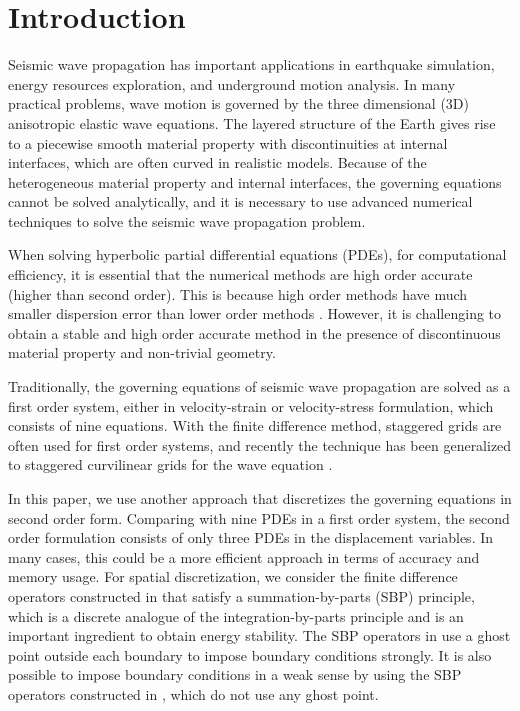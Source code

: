 \section{Introduction}
Seismic wave propagation has important applications in earthquake simulation, energy resources exploration, and underground motion analysis. In many practical problems, wave motion is governed by the three dimensional (3D) anisotropic elastic wave equations. The layered structure of the Earth gives rise to a piecewise smooth material property with discontinuities at internal interfaces, which are often curved in realistic models. Because of the heterogeneous material property and internal interfaces, the governing equations cannot be solved analytically, and it is necessary to use advanced numerical techniques to solve the seismic wave propagation problem.

When solving hyperbolic partial differential equations (PDEs), for computational efficiency, it is essential that the numerical methods are high order accurate (higher than second order). This is because high order methods have much smaller dispersion error than lower order methods  \cite{Hagstrom2012,Kreiss1972}. However, it is challenging to obtain a stable and high order accurate method in the presence of discontinuous material property and non-trivial geometry. 

Traditionally, the governing equations of seismic wave propagation are solved as a first order system, either in velocity-strain or velocity-stress formulation, which consists of nine equations. With the finite difference method, staggered grids are often used for first order systems, and recently the technique has been generalized to staggered curvilinear grids for the wave equation \cite{OReilly2020}.

In this paper, we use another approach that discretizes the governing equations in second order form. Comparing with nine PDEs in a first order system, the second order formulation consists of only three PDEs in the displacement variables. In many cases, this could be a more efficient approach in terms of accuracy and memory usage. For spatial discretization, we consider the finite difference operators constructed in \cite{sjogreen2012fourth} that satisfy a summation-by-parts (SBP) principle, which is a discrete analogue of the integration-by-parts principle and is an important ingredient to obtain energy stability. The SBP operators in \cite{sjogreen2012fourth} use a ghost point outside each boundary to impose  boundary conditions strongly. It is also possible to impose boundary conditions in a weak sense \cite{Carpenter1994} by using the SBP operators constructed in \cite{Mattsson2012}, which do not use any ghost point.


